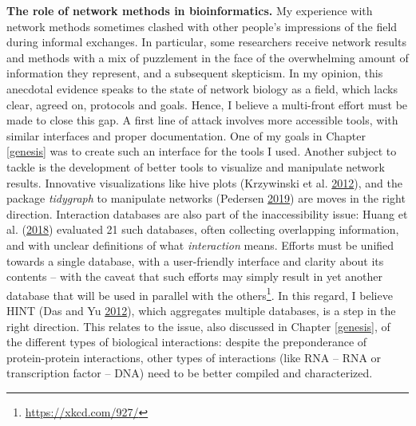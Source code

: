 \documentclass[
  11pt,
]{env/yjiao}
\begin{document}
\textbf{The role of network methods in bioinformatics.} My experience with network methods sometimes clashed with other people's impressions of the field during informal exchanges. In particular, some researchers receive network results and methods with a mix of puzzlement in the face of the overwhelming amount of information they represent, and a subsequent skepticism. In my opinion, this anecdotal evidence speaks to the state of network biology as a field, which lacks clear, agreed on, protocols and goals. Hence, I believe a multi-front effort must be made to close this gap. A first line of attack involves more accessible tools, with similar interfaces and proper documentation. One of my goals in Chapter \ref{genesis} was to create such an interface for the tools I used. Another subject to tackle is the development of better tools to visualize and manipulate network results. Innovative visualizations like hive plots (Krzywinski et al. \protect\hyperlink{ref-krzywinski_hive_2012}{2012}), and the package \emph{tidygraph} to manipulate networks (Pedersen \protect\hyperlink{ref-pedersen_tidygraph_2019}{2019}) are moves in the right direction. Interaction databases are also part of the inaccessibility issue: Huang et al. (\protect\hyperlink{ref-huang_systematic_2018}{2018}) evaluated 21 such databases, often collecting overlapping information, and with unclear definitions of what \emph{interaction} means. Efforts must be unified towards a single database, with a user-friendly interface and clarity about its contents -- with the caveat that such efforts may simply result in yet another database that will be used in parallel with the others\footnote{\url{https://xkcd.com/927/}}. In this regard, I believe HINT (Das and Yu \protect\hyperlink{ref-das_hint_2012}{2012}), which aggregates multiple databases, is a step in the right direction. This relates to the issue, also discussed in Chapter \ref{genesis}, of the different types of biological interactions: despite the preponderance of protein-protein interactions, other types of interactions (like RNA -- RNA or transcription factor -- DNA) need to be better compiled and characterized.
\end{document}
